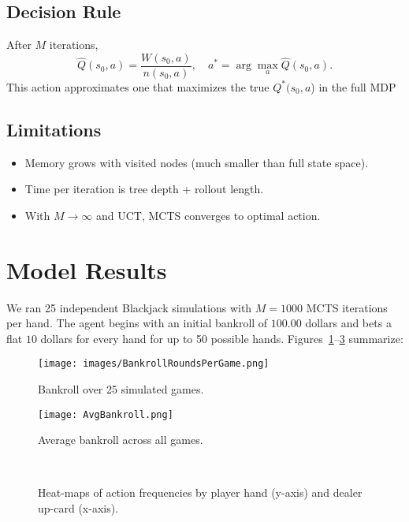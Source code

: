 \documentclass[12pt,a4paper]{cibb}
\begin{document}
\subsection{{Decision Rule}}
After \(M\) iterations,
\[
 \hat Q(s_0,a)=\frac{W(s_0,a)}{n(s_0,a)},\quad a^*=\arg\max_a \hat Q(s_0,a).
\]
This action approximates one that maximizes the true $Q^*(s_0,a$) in the full MDP

\subsection{{Limitations}}
\begin{itemize}[leftmargin=1.5cm]
  \item Memory grows with visited nodes (much smaller than full state space).  
  \item Time per iteration is tree depth + rollout length.  
  \item With \(M\to\infty\) and UCT, MCTS converges to optimal action.  
\end{itemize}

\section{Model Results}
We ran 25 independent Blackjack simulations with \(M=1000\) MCTS iterations per hand. The agent begins with an initial bankroll of $100.00$ dollars and bets a flat $10$ dollars for every hand for up to 50 possible hands. Figures~\ref{fig:bankroll}–\ref{fig:action_heatmaps} summarize:

\begin{figure}[H]
  \centering
  \texttt{[image: images/BankrollRoundsPerGame.png]}
  \caption{Bankroll over 25 simulated games.}
  \label{fig:bankroll}
\end{figure}

\begin{figure}[H]
  \centering
  \texttt{[image: AvgBankroll.png]}
  \caption{Average bankroll across all games.}
  \label{fig:avg_bankroll}
\end{figure}

\begin{figure}[H]
  \centering
  \\
  \caption{Heat-maps of action frequencies by player hand (y-axis) and dealer up-card (x-axis).}
  \label{fig:action_heatmaps}
\end{figure}
\end{document}
